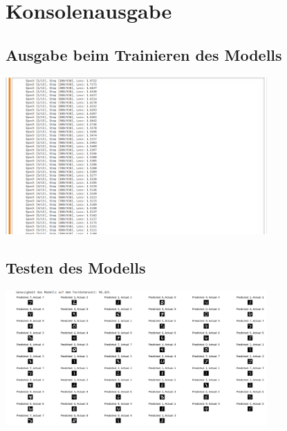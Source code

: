 \documentclass[a4paper,11pt,titlepage]{article}
\begin{document}
\section{Konsolenausgabe}
\subsection{Ausgabe beim Trainieren des Modells}
\includegraphics[width=10cm]{Konsolenausgabe_Trainig_neuronales_Netz.png}
\subsection{Testen des Modells}
\includegraphics[width=10cm]{Konsolenausgabe_Test_neuronales_Netz.png}
\end{document}
